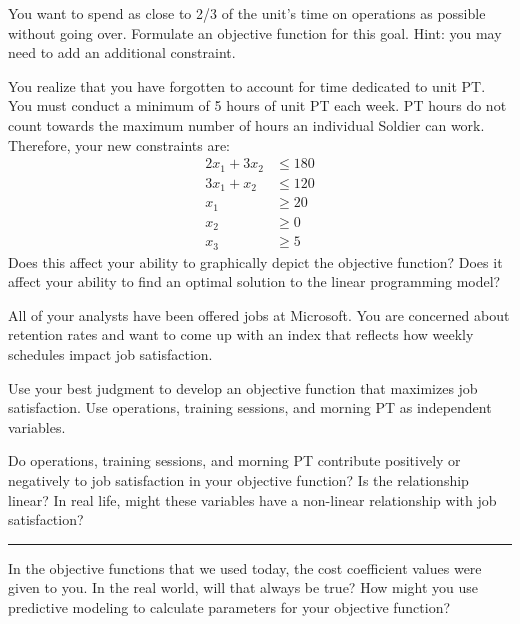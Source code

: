 \documentclass[11pt]{article}
\begin{document}
\vfill

\newpage


\leavevmode\hspace*{\parindent}You want to spend as close to 2/3 of the unit's time on operations as possible without going over.
Formulate an objective function for this goal. Hint: you may need to add an additional constraint.

\vfill

You realize that you have forgotten to account for time dedicated to unit PT. You must conduct a minimum of 5 hours of unit PT each week. PT hours do not count towards the maximum number of hours an individual Soldier can work. Therefore, your new constraints are: 
\begin{align*}
2x_1 + 3x_2 &\le 180 \\
3x_1 + x_2 &\le 120 \\
x_1 &\ge 20 \\
x_2 &\ge 0 \\
x_3 &\ge 5
\end{align*}
Does this affect your ability to graphically depict the objective function?
Does it affect your ability to find an optimal solution to the linear programming model?

\vfill


\leavevmode\hspace*{\parindent}All of your analysts have been offered jobs at Microsoft. 
You are concerned about retention rates and want to come up with an index that reflects how weekly schedules impact job satisfaction. 

Use your best judgment to develop an objective function that maximizes job satisfaction. Use operations, training sessions, and morning PT as independent variables.

\vfill

Do operations, training sessions, and morning PT contribute positively or negatively to job satisfaction in your objective function? Is the relationship linear? In real life, might these variables have a non-linear relationship with job satisfaction?

\vfill

\hrule


\noindent In the objective functions that we used today, the cost coefficient values were given to you. In the real world, will that always be true? How might you use predictive modeling to calculate parameters for your objective function?
\end{document}
